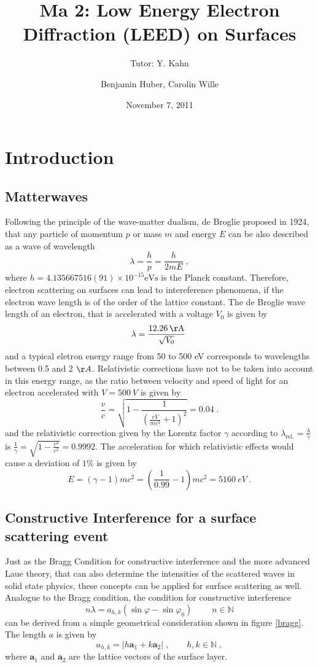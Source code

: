 \documentclass[a4paper]{scrartcl}
\title{Ma 2: Low Energy Electron Diffraction (LEED) on Surfaces}
\subtitle{Tutor: Y. Kahn}
\author{Benjamin Huber, Carolin Wille}
\date{November 7, 2011}
\numberwithin{equation}{section}
\numberwithin{figure}{section}
\numberwithin{table}{section}
\newcommand{\eq}[2]{\begin{equation}#1\label{#2}\end{equation}}
\newcommand{\ve}[1]{\mathbf{ #1} }
\begin{document}
\thispagestyle{empty}
\maketitle
\tableofcontents
\clearpage


\section{Introduction}
\subsection{Matterwaves}
Following the principle of the wave-matter dualism, de Broglie proposed in 1924, that any particle of momentum $p$ or mass $m$ and energy $E$ can be also described as a wave of wavelength 
\eq{\lambda = \frac{h}{p} =\frac{h}{2mE} \;,}{lambda}
where $h=4.135667516(91)\times 10^{-15} \text{eVs}$ is the Planck constant. Therefore, electron scattering on surfaces can lead to intereference phenomena, if the electron wave length is of the order of the lattice constant. The de Broglie wave length of an electron, that is accelerated with a voltage $V_0$ is given by 
\eq{\lambda= \frac{\SI{12.26}{\AA}}{\sqrt{V_0}} \; }{lV}
and a typical eletron energy range from 50 to 500 eV corresponds to wavelengths between 0.5 and 2 $\AA$. Relativistic corrections have not to be taken into account in this energy range, as the ratio between velocity and speed of light for an electron accelerated with $V = \SI{500}{V}$ is given by
\eq{\frac{v}{c}=\sqrt{1-\frac{1}{(\frac{eV}{mc^2}+1)^2}} =0.04 \; .}{} 
and the relativistic correction given by the Lorentz factor $\gamma$ according to $\lambda_\text{rel.} = \frac{\lambda}{\gamma}$ is $\frac{1}{\gamma} = \sqrt{1-\frac{v^2}{c^2}}= 0.9992$. The acceleration for which relativistic effects would cause a deviation of $1\percent$ is given by
\eq{E=(\gamma -1)mc^2= \left(\frac{1}{0.99}-1\right)mc^2=\SI{5160}{eV}\;. }{}

\subsection{Constructive Interference for a surface scattering event}
Just as the Bragg Condition for constructive interference and the more advanced Laue theory, that can also determine the intensities of the scattered waves in solid state physics, these concepts can be applied for surface scattering as well. Analogue to the Bragg condition, the condition for constructive interference 
\eq{n \lambda = a_{h,k} (\sin \varphi - \sin \varphi_0 ) \; \qquad n \in \mathbb N }{bragg}
can be derived from a simple geometrical consideration shown in figure \ref{bragg}. The length $a$ is given by
\eq{a_{h,k} = |h \ve a_1 + k \ve a_2|\;, \qquad h,k \in \mathbb N \; , }{}
where $\ve a_1$ and $\ve a_2$ are the lattice vectors of the surface layer.
\end{document}
